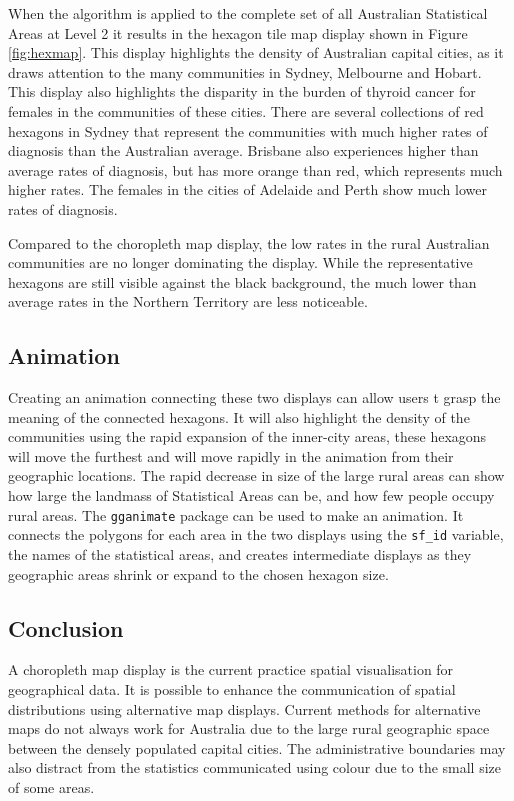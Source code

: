 When the algorithm is applied to the complete set of all Australian
Statistical Areas at Level 2 it results in the hexagon tile map display
shown in Figure \ref{fig:hexmap}. This display highlights the density of
Australian capital cities, as it draws attention to the many communities
in Sydney, Melbourne and Hobart. This display also highlights the
disparity in the burden of thyroid cancer for females in the communities
of these cities. There are several collections of red hexagons in Sydney
that represent the communities with much higher rates of diagnosis than
the Australian average. Brisbane also experiences higher than average
rates of diagnosis, but has more orange than red, which represents much
higher rates. The females in the cities of Adelaide and Perth show much
lower rates of diagnosis.

Compared to the choropleth map display, the low rates in the rural
Australian communities are no longer dominating the display. While the
representative hexagons are still visible against the black background,
the much lower than average rates in the Northern Territory are less
noticeable.

\hypertarget{animation}{%
\subsection{Animation}\label{animation}}

Creating an animation connecting these two displays can allow users t
grasp the meaning of the connected hexagons. It will also highlight the
density of the communities using the rapid expansion of the inner-city
areas, these hexagons will move the furthest and will move rapidly in
the animation from their geographic locations. The rapid decrease in
size of the large rural areas can show how large the landmass of
Statistical Areas can be, and how few people occupy rural areas. The
\texttt{gganimate} \citep{gganimate} package can be used to make an
animation. It connects the polygons for each area in the two displays
using the \texttt{sf\_id} variable, the names of the statistical areas,
and creates intermediate displays as they geographic areas shrink or
expand to the chosen hexagon size.

\hypertarget{conclusion-03}{%
\subsection{Conclusion}\label{conclusion-03}}

A choropleth map display is the current practice spatial visualisation
for geographical data. It is possible to enhance the communication of
spatial distributions using alternative map displays. Current methods
for alternative maps do not always work for Australia due to the large
rural geographic space between the densely populated capital cities. The
administrative boundaries may also distract from the statistics
communicated using colour due to the small size of some areas.

